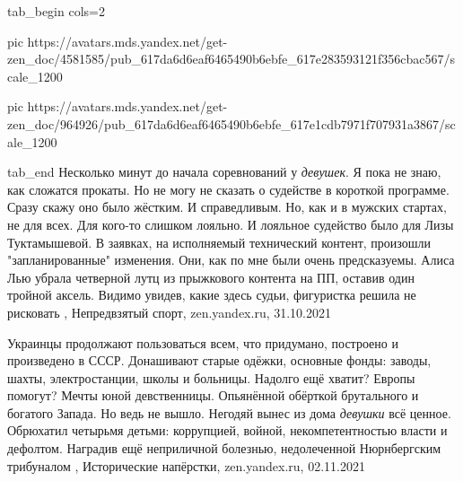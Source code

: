 \ifcmt
  tab_begin cols=2

     pic https://avatars.mds.yandex.net/get-zen_doc/4581585/pub_617da6d6eaf6465490b6ebfe_617e283593121f356cbac567/scale_1200

     pic https://avatars.mds.yandex.net/get-zen_doc/964926/pub_617da6d6eaf6465490b6ebfe_617e1cdb7971f707931a3867/scale_1200

  tab_end
\fi
Несколько минут до начала соревнований у \emph{девушек}. Я пока не знаю, как
сложатся прокаты. Но не могу не сказать о судействе в короткой программе. Сразу
скажу оно было жёстким. И справедливым. Но, как и в мужских стартах, не для
всех. Для кого-то слишком лояльно. И лояльное судейство было для Лизы
Туктамышевой.  В заявках, на исполняемый технический контент, произошли
"запланированные" изменения. Они, как по мне были очень предсказуемы. Алиса Лью
убрала четверной лутц из прыжкового контента на ПП, оставив один тройной
аксель. Видимо увидев, какие здесь судьи, фигуристка решила не рисковать
, 
Непредвзятый спорт, zen.yandex.ru, 31.10.2021

Украинцы продолжают пользоваться всем, что придумано, построено и произведено в
СССР. Донашивают старые одёжки, основные фонды: заводы, шахты, электростанции,
школы и больницы. Надолго ещё хватит? Европы помогут? Мечты юной девственницы.
Опьянённой обёрткой брутального и богатого Запада.  Но ведь не вышло. Негодяй
вынес из дома \emph{девушки} всё ценное. Обрюхатил четырьмя детьми: коррупцией,
войной, некомпетентностью власти и дефолтом. Наградив ещё неприличной болезнью,
недолеченной Нюрнбергским трибуналом
, 
Исторические напёрстки, zen.yandex.ru, 02.11.2021
